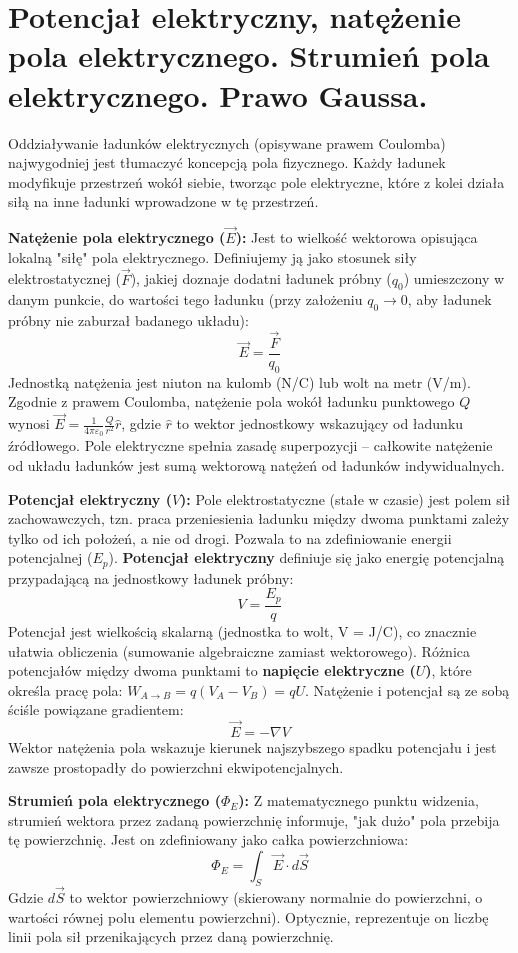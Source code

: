 \documentclass[11pt, a4paper]{article}
\begin{document}
\section{Potencjał elektryczny, natężenie pola elektrycznego. Strumień pola elektrycznego. Prawo Gaussa.}

Oddziaływanie ładunków elektrycznych (opisywane prawem Coulomba) najwygodniej jest tłumaczyć koncepcją pola fizycznego. Każdy ładunek modyfikuje przestrzeń wokół siebie, tworząc pole elektryczne, które z kolei działa siłą na inne ładunki wprowadzone w tę przestrzeń.

\textbf{Natężenie pola elektrycznego ($\vec{E}$):}
Jest to wielkość wektorowa opisująca lokalną "siłę" pola elektrycznego. Definiujemy ją jako stosunek siły elektrostatycznej ($\vec{F}$), jakiej doznaje dodatni ładunek próbny ($q_0$) umieszczony w danym punkcie, do wartości tego ładunku (przy założeniu $q_0 \to 0$, aby ładunek próbny nie zaburzał badanego układu):
\[
\vec{E} = \frac{\vec{F}}{q_0}
\]
Jednostką natężenia jest niuton na kulomb (N/C) lub wolt na metr (V/m). Zgodnie z prawem Coulomba, natężenie pola wokół ładunku punktowego $Q$ wynosi $\vec{E} = \frac{1}{4\pi\varepsilon_0} \frac{Q}{r^2} \hat{r}$, gdzie $\hat{r}$ to wektor jednostkowy wskazujący od ładunku źródłowego. Pole elektryczne spełnia zasadę superpozycji – całkowite natężenie od układu ładunków jest sumą wektorową natężeń od ładunków indywidualnych.

\textbf{Potencjał elektryczny ($V$):}
Pole elektrostatyczne (stałe w czasie) jest polem sił zachowawczych, tzn. praca przeniesienia ładunku między dwoma punktami zależy tylko od ich położeń, a nie od drogi. Pozwala to na zdefiniowanie energii potencjalnej ($E_p$). \textbf{Potencjał elektryczny} definiuje się jako energię potencjalną przypadającą na jednostkowy ładunek próbny:
\[
V = \frac{E_p}{q}
\]
Potencjał jest wielkością skalarną (jednostka to wolt, V = J/C), co znacznie ułatwia obliczenia (sumowanie algebraiczne zamiast wektorowego). Różnica potencjałów między dwoma punktami to \textbf{napięcie elektryczne ($U$)}, które określa pracę pola: $W_{A\to B} = q(V_A - V_B) = qU$. Natężenie i potencjał są ze sobą ściśle powiązane gradientem:
\[
\vec{E} = -\nabla V
\]
Wektor natężenia pola wskazuje kierunek najszybszego spadku potencjału i jest zawsze prostopadły do powierzchni ekwipotencjalnych.

\textbf{Strumień pola elektrycznego ($\Phi_E$):}
Z matematycznego punktu widzenia, strumień wektora przez zadaną powierzchnię informuje, "jak dużo" pola przebija tę powierzchnię. Jest on zdefiniowany jako całka powierzchniowa:
\[
\Phi_E = \int_S \vec{E} \cdot d\vec{S}
\]
Gdzie $d\vec{S}$ to wektor powierzchniowy (skierowany normalnie do powierzchni, o wartości równej polu elementu powierzchni). Optycznie, reprezentuje on liczbę linii pola sił przenikających przez daną powierzchnię.
\end{document}
